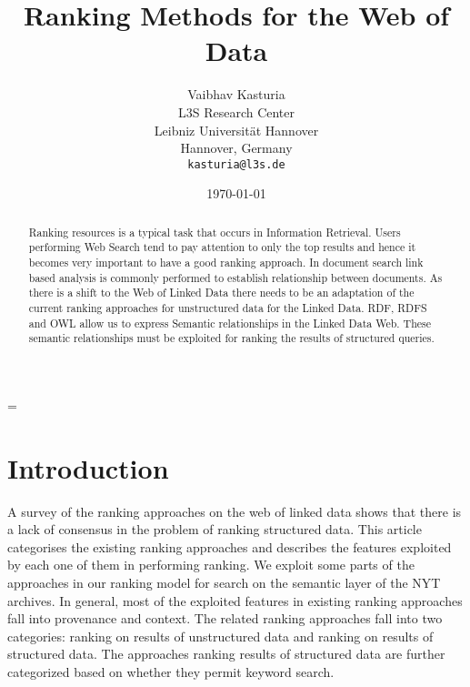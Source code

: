 \documentclass{article}
\begin{document}
    \title{Ranking Methods for the Web of Data}

    \author{
    Vaibhav Kasturia\\
    L3S Research Center\\
    Leibniz Universit\"{a}t Hannover\\
    Hannover, Germany\\
    \texttt{kasturia@l3s.de}
    }
    \date{\today}
    \maketitle

    \emergencystretch=\maxdimen

    \begin{abstract}
    \noindent Ranking resources is a typical task that occurs in Information Retrieval. Users performing Web Search tend to pay attention to only the top results and hence it becomes very important to have a good ranking approach. In document search link based analysis is commonly performed to establish relationship between documents. As there is a shift to the Web of Linked Data there needs to be an adaptation of the current ranking approaches for unstructured data for the Linked Data. RDF, RDFS and OWL allow us to express Semantic relationships in the Linked Data Web. These semantic relationships must be exploited for ranking the results of structured queries.
    \end{abstract}

    \section{Introduction}
    A survey of the ranking approaches on the web of linked data shows that there is a lack of consensus in the problem of ranking structured data. This article categorises the existing ranking approaches and describes the features exploited by each one of them in performing ranking. We exploit some parts of the approaches in our ranking model for search on the semantic layer of the NYT archives. In general, most of the exploited features in existing ranking approaches fall into provenance and context. The related ranking approaches fall into two categories: ranking on results of unstructured data and ranking on results of structured data. The approaches ranking results of structured data are further categorized based on whether they permit keyword search.
\end{document}
